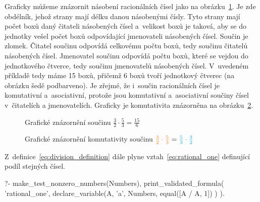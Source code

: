 Graficky můžeme znázornit násobení racionálních čísel jako na obrázku~\ref{img:rational_multiplication_definition}.
Je zde obdélník, jehož strany mají délku danou násobenými čísly. Tyto strany mají počet boxů daný čitateli násobených čísel a~velikost boxů je taková, aby se do jednotky vešel počet boxů odpovídající jmenovateli násobených čísel. Součin je zlomek. Čitatel součinu odpovídá celkovému počtu boxů, tedy součinu čitatelů násobených čísel. Jmenovatel součinu odpovídá počtu boxů, které se vejdou do jednotkového čtverce, tedy součinu jmenovatelů násobených čísel. V~uvedeném příkladě tedy máme 15 boxů, přičemž 6 boxů tvoří jednotkový čtverec (na obrázku šedě podbarveno). Je zřejmé, že i~součin racionálních čísel je komutativní a~asociativní, protože jsou komutativní a~asociativní součiny čísel v~čitatelích a jmenovatelích. Graficky je komutativita znázorněna na obrázku~\ref{img:rational_multiplication_comutativity}.

\begin{figure}[!h]
\centering
{}
\caption{Grafické znázornění součinu \(\frac{3}{2} \cdot \frac{5}{3} = \frac{15}{6}\)}
\label{img:rational_multiplication_definition}
\end{figure}


\begin{figure}[!h]
\centering
{}
\caption{Grafické znázornění komutativity součinu \(\textcolor{orange}{\frac{3}{2} \cdot \frac{5}{3}} = \textcolor{cyan}{\frac{5}{3} \cdot \frac{3}{2}}\)}
\label{img:rational_multiplication_comutativity}
\end{figure}

Z~definice~\eqref{eq:division_definition} dále plyne vztah~\eqref{eq:rational_one} definující podíl stejných čísel.

\begin{prolog}
?-	make_test_nonzero_numbers(Numbers),
	print_validated_formula(
		'rational_one',
		declare_variable(A, 'a', Numbers,
			equal([A / A, 1])
		)
	).
\end{prolog}

